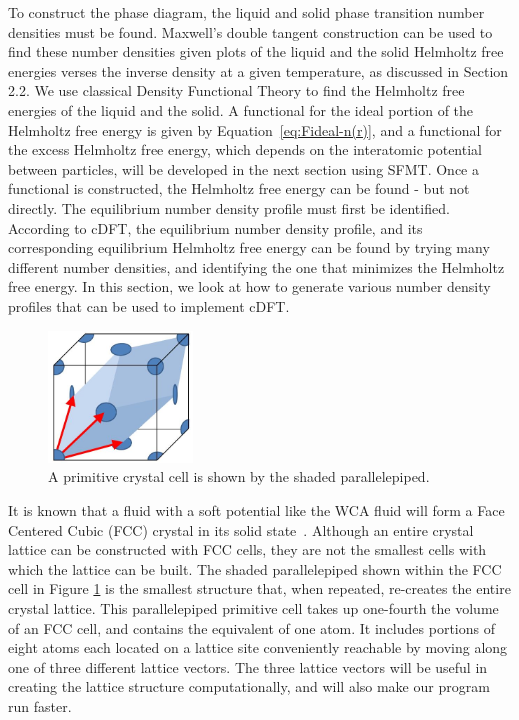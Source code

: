 \documentclass[double,12pt]{beavtex}
\begin{document}
To construct the phase diagram, the liquid and solid phase transition number densities
must be found. Maxwell's double tangent construction can be used to find 
these number densities given plots of the liquid and the solid Helmholtz 
free energies verses the inverse density at a given temperature, as
discussed in Section 2.2. We use classical Density Functional Theory 
to find the Helmholtz free energies of the liquid and the solid. 
A functional for the ideal portion of the
Helmholtz free energy is given by Equation~\ref{eq:Fideal-n(r)}, and a 
functional for 
the excess Helmholtz free energy, which depends on the interatomic potential
between particles, will be developed in the next section using SFMT. 
Once a functional is constructed, the Helmholtz free energy can be found - 
but not directly. The equilibrium number density profile must first be 
identified. According to cDFT, the equilibrium number density profile, 
and its corresponding equilibrium Helmholtz free energy can be found 
by trying many different number densities, and identifying the one that 
minimizes the Helmholtz free energy. In this section, we look at how to 
generate various number density profiles that can be used to implement cDFT. 

\begin{figure}
  \centering
  \includegraphics[height=3.5cm]{PrimitiveCellLightBlue.png}
  \caption{A primitive crystal cell is shown by the shaded parallelepiped.}
  \label{fig:primitivecell}
\end{figure}

It is known that a fluid with a soft potential like the WCA fluid will 
form a Face Centered Cubic (FCC) crystal in its solid state~\cite{Hansen}. 
Although an entire 
crystal lattice can be constructed with FCC cells, 
they are not the smallest cells with which the lattice can be built. 
The shaded parallelepiped shown within the FCC cell in Figure \ref{fig:primitivecell} 
is the smallest structure that, when repeated, re-creates the entire crystal 
lattice. This parallelepiped primitive cell takes up one-fourth the volume 
of an FCC cell, and contains the equivalent of one atom.
It includes portions of eight atoms each located on a lattice site conveniently 
reachable by moving along one of three different lattice vectors. 
The three lattice vectors will be useful in 
creating the lattice structure computationally, and will also make our 
program run faster.
\end{document}

